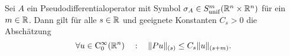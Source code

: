 \begin{cor}
Sei $A$ ein Pseudodifferentialoperator mit Symbol $\sigma_A\in S^m_{\rm unif}(\mathbb R^n\times\mathbb R^n)$ für ein $m\in\mathbb R$. Dann gilt für alle $s\in\mathbb R$ und geeignete Konstanten $C_s>0$ die Abschätzung
\begin{equation}
  \forall u\in\mathrm C_0^\infty(\mathbb R^n)\quad:\quad \|Pu \|_{(s)} \le C_s \|u\|_{(s+m)}.
\end{equation}
\end{cor}

%
%

